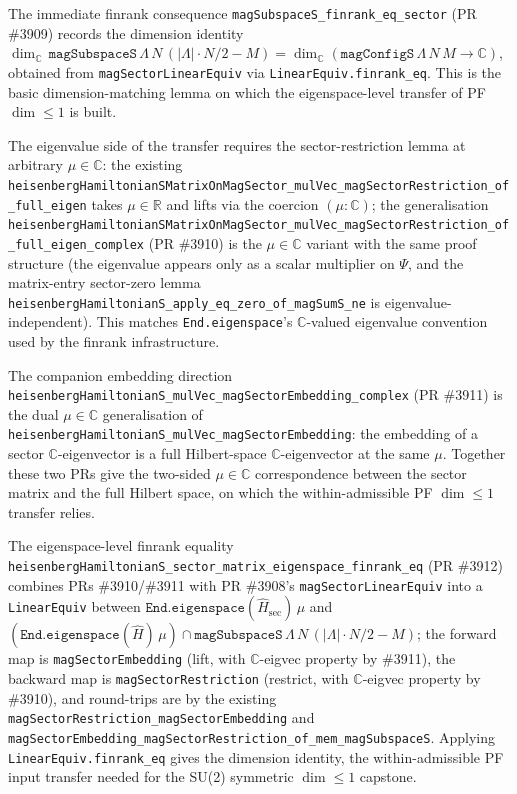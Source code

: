 \documentclass[a4paper,11pt]{article}
\begin{document}
The immediate finrank consequence
\texttt{magSubspaceS\_finrank\_eq\_sector} (PR \#3909) records the dimension
identity \(\dim_{\mathbb C}\,\texttt{magSubspaceS}\,\Lambda\,N\,(|\Lambda|\cdot
N/2 - M) = \dim_{\mathbb C}(\texttt{magConfigS}\,\Lambda\,N\,M\to\mathbb C)\),
obtained from \texttt{magSectorLinearEquiv} via
\texttt{LinearEquiv.finrank\_eq}.  This is the basic dimension-matching lemma
on which the eigenspace-level transfer of PF \(\dim\le1\) is built.

The eigenvalue side of the transfer requires the sector-restriction lemma at
arbitrary \(\mu\in\mathbb C\): the existing
\texttt{heisenbergHamiltonianSMatrixOnMagSector\_mulVec\_magSectorRestriction\_of\_full\_eigen}
takes \(\mu\in\mathbb R\) and lifts via the coercion \((\mu:\mathbb C)\); the
generalisation
\texttt{heisenbergHamiltonianSMatrixOnMagSector\_mulVec\_magSectorRestriction\_of\_full\_eigen\_complex}
(PR \#3910) is the \(\mu\in\mathbb C\) variant with the same proof structure
(the eigenvalue appears only as a scalar multiplier on \(\Psi\), and the matrix-entry
sector-zero lemma
\texttt{heisenbergHamiltonianS\_apply\_eq\_zero\_of\_magSumS\_ne} is
eigenvalue-independent).  This matches \texttt{End.eigenspace}'s
\(\mathbb C\)-valued eigenvalue convention used by the finrank infrastructure.

The companion embedding direction
\texttt{heisenbergHamiltonianS\_mulVec\_magSectorEmbedding\_complex} (PR \#3911)
is the dual \(\mu\in\mathbb C\) generalisation of
\texttt{heisenbergHamiltonianS\_mulVec\_magSectorEmbedding}: the embedding of a
sector \(\mathbb C\)-eigenvector is a full Hilbert-space
\(\mathbb C\)-eigenvector at the same \(\mu\).  Together these two PRs give the
two-sided \(\mu\in\mathbb C\) correspondence between the sector matrix and the
full Hilbert space, on which the within-admissible PF \(\dim\le1\) transfer
relies.

The eigenspace-level finrank equality
\texttt{heisenbergHamiltonianS\_sector\_matrix\_eigenspace\_finrank\_eq} (PR
\#3912) combines PRs \#3910/\#3911 with PR \#3908's
\texttt{magSectorLinearEquiv} into a \texttt{LinearEquiv} between
\(\texttt{End.eigenspace}(\hat{H}_{\text{sec}})\,\mu\) and
\((\texttt{End.eigenspace}(\hat{H})\,\mu)\cap\texttt{magSubspaceS}\,\Lambda\,N\,(|\Lambda|\cdot
N/2 - M)\); the forward map is \texttt{magSectorEmbedding} (lift, with
\(\mathbb C\)-eigvec property by \#3911), the backward map is
\texttt{magSectorRestriction} (restrict, with \(\mathbb C\)-eigvec property by
\#3910), and round-trips are by the existing
\texttt{magSectorRestriction\_magSectorEmbedding} and
\texttt{magSectorEmbedding\_magSectorRestriction\_of\_mem\_magSubspaceS}.
Applying \texttt{LinearEquiv.finrank\_eq} gives the dimension identity, the
within-admissible PF input transfer needed for the SU(2) symmetric
\(\dim\le1\) capstone.
\end{document}
